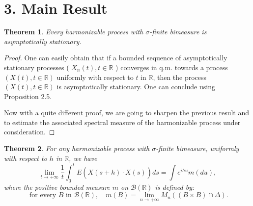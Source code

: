\documentclass{article}
\begin{document}
\section*{3. Main Result}
\newtheorem{theorem}{Theorem}[section] %
\begin{theorem} %
Every harmonizable process with \(\sigma\)-finite bimeasure is asymptotically stationary.
\end{theorem}

\begin{proof}
One can easily obtain that if a bounded sequence of asymptotically stationary processes ( \(X_{n}(t), t \in \mathbb{R}\) ) converges in q.m. towards a process \((X(t), t \in \mathbb{R})\) uniformly with respect to \(t\) in \(\mathbb{R}\), then the process \((X(t), t \in \mathbb{R})\) is asymptotically stationary. One can conclude using Proposition 2.5.

Now with a quite different proof, we are going to sharpen the previous result and to estimate the associated spectral measure of the harmonizable process under consideration.
\end{proof}

\begin{theorem} %
For any harmonizable process with \(\sigma\)-finite bimeasure, uniformly with respect to \(h\) in \(\mathbb{R}\), we have
\[
\lim _{t \rightarrow+\infty} \frac{1}{t} \int_{0}^{t} E(X(s+h) \cdot \overline{X(s)}) d s=\int e^{i h u} m(d u),
\]
where the positive bounded measure \(m\) on \(\mathscr{B}(\mathbb{R})\) is defined by:
\[
\text { for every } B \text { in } \mathscr{B}(\mathbb{R}), \quad m(B)=\lim _{n \rightarrow+\infty} M_{n}((B \times B) \cap \Delta) .
\]
\end{theorem}
\end{document}
